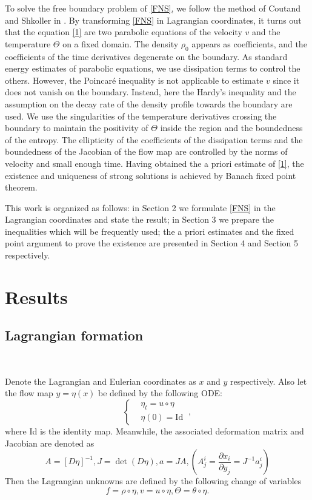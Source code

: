 \documentclass[12pt,a4paper]{amsart}
\numberwithin{equation}{section}
\theoremstyle{plain}
\theoremstyle{definition}
\begin{document}
To solve the free boundary problem of \eqref{FNS}, we follow the method of Coutand and Shkoller in \cite{Coutand2012}. By transforming \eqref{FNS} in Lagrangian coordinates, it turns out that the equation \eqref{1} are two parabolic equations of the velocity $v$ and the temperature $\Theta$ on a fixed domain. The density $\rho_0$ appears as coefficients, and the coefficients of the time derivatives degenerate on the boundary. As standard energy estimates of parabolic equations, we use dissipation terms to control the others. However, the Poincar\'{e} inequality is not applicable to estimate $v$ since it does not vanish on the boundary. Instead, here the Hardy's inequality and the assumption on the decay rate of the density profile towards the boundary are used. We use the singularities of the temperature derivatives crossing the boundary to maintain the positivity of $\Theta$ inside the region and the boundedness of the entropy.
The ellipticity of the coefficients of the dissipation terms and the boundedness of the Jacobian of the flow map are controlled by the norms of velocity and small enough time. Having obtained the a priori estimate of \eqref{1}, the existence and uniqueness of strong solutions is achieved by Banach fixed point theorem.   



This work is organized as follows: in Section 2 we formulate \eqref{FNS} in the Lagrangian coordinates and state the result; in Section 3 we prepare the inequalities which will be frequently used; the a priori estimates and the fixed point argument to prove the existence are presented in Section 4 and Section 5 respectively.




\vspace{0.7cm}
\section{Results}

\subsection{Lagrangian formation}~

Denote the Lagrangian and Eulerian coordinates as $x$ and $y$ respectively.
Also let the flow map $y=\eta(x)$ be defined by the following ODE:
\begin{equation}\label{def-eta}
\left\{
\begin{aligned}
&\eta_t=u\circ \eta\\
&\eta(0)=\text{Id}~
\end{aligned}
\right. ,
\end{equation}
where Id is the identity map.
Meanwhile, the associated deformation matrix and Jacobian are denoted as 
$$
A=[D\eta]^{-1}, 
J=\det (D\eta), 
a=JA,
(A^i_j=\frac{\partial x_i}{\partial y_j}=J^{-1}a^i_j)
$$
Then the Lagrangian unknowns are defined by the following change of variables
$$
f=\rho \circ \eta,
v=u\circ \eta,
\Theta=\theta \circ \eta.
$$
\end{document}
